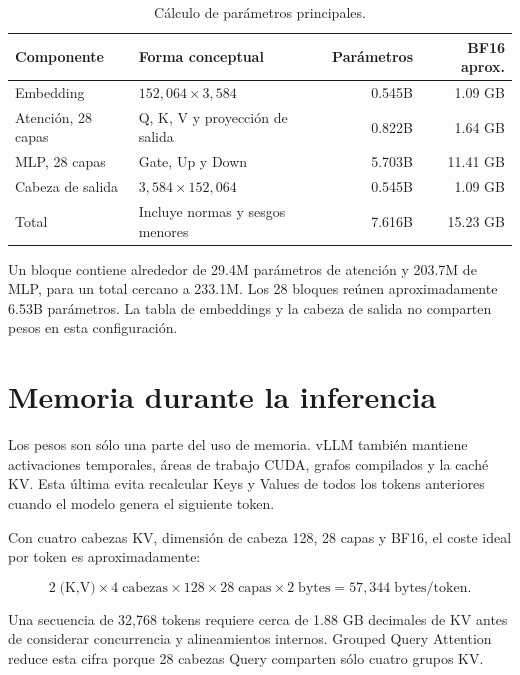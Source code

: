 \begin{table}[htbp]
  \centering
  \caption{Cálculo de parámetros principales.}
  \label{tab:qwen-parameter-math}
  \begin{tabularx}{\textwidth}{@{}l X r r@{}}
    \toprule
    Componente & Forma conceptual & Parámetros & BF16 aprox. \\
    \midrule
    Embedding & $152{,}064 \times 3{,}584$ & 0.545B & 1.09 GB \\
    Atención, 28 capas & Q, K, V y proyección de salida & 0.822B & 1.64 GB \\
    MLP, 28 capas & Gate, Up y Down & 5.703B & 11.41 GB \\
    Cabeza de salida & $3{,}584 \times 152{,}064$ & 0.545B & 1.09 GB \\
    \midrule
    Total & Incluye normas y sesgos menores & 7.616B & 15.23 GB \\
    \bottomrule
  \end{tabularx}
\end{table}

Un bloque contiene alrededor de 29.4M parámetros de atención y 203.7M de MLP,
para un total cercano a 233.1M. Los 28 bloques reúnen aproximadamente 6.53B
parámetros. La tabla de embeddings y la cabeza de salida no comparten pesos en
esta configuración.

\section{Memoria durante la inferencia}

Los pesos son sólo una parte del uso de memoria. vLLM también mantiene
activaciones temporales, áreas de trabajo CUDA, grafos compilados y la caché KV.
Esta última evita recalcular Keys y Values de todos los tokens anteriores cuando
el modelo genera el siguiente token.

Con cuatro cabezas KV, dimensión de cabeza 128, 28 capas y BF16, el coste ideal
por token es aproximadamente:

\begin{equation}
  2\;\text{(K,V)} \times 4\;\text{cabezas} \times 128 \times
  28\;\text{capas} \times 2\;\text{bytes}
  = 57{,}344\;\text{bytes/token}.
\end{equation}

Una secuencia de 32,768 tokens requiere cerca de 1.88 GB decimales de KV antes
de considerar concurrencia y alineamientos internos. Grouped Query Attention
reduce esta cifra porque 28 cabezas Query comparten sólo cuatro grupos KV.

